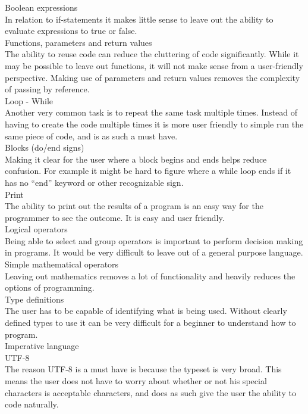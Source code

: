 Boolean expressions \\
In relation to if-statements it makes little sense to leave out the ability to evaluate expressions to true or false. \\

Functions, parameters and return values \\
The ability to reuse code can reduce the cluttering of code significantly. While it may be possible to leave out functions, it will not make sense from a user-friendly perspective. Making use of parameters and return values removes the complexity of passing by reference. \\

Loop - While \\
Another very common task is to repeat the same task multiple times. Instead of having to create the code multiple times it is more user friendly to simple run the same piece of code, and is as such a must have. \\

Blocks (do/end signs) \\
Making it clear for the user where a block begins and ends helps reduce confusion. For example it might be hard to figure where a while loop ends if it has no ``end'' keyword or other recognizable sign. \\

Print \\
The ability to print out the results of a program is an easy way for the programmer to see the outcome. It is easy and user friendly. \\

Logical operators \\
Being able to select and group operators is important to perform decision making in programs. It would be very difficult to leave out of a general purpose language.\\

Simple mathematical operators \\
Leaving out mathematics removes a lot of functionality and heavily reduces the options of programming. \\

Type definitions \\
The user has to be capable of identifying what is being used. Without clearly defined types to use it can be very difficult for a beginner to understand how to program. \\

Imperative language \\ 

UTF-8 \\
The reason UTF-8 is a must have is because the typeset is very broad. This means the user does not have to worry about whether or not his special characters is acceptable characters, and does as such give the user the ability to code naturally.